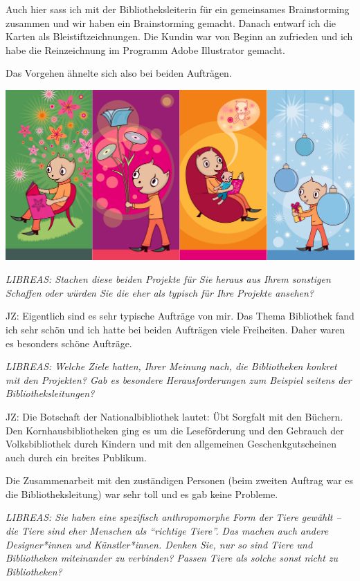 \documentclass[a4paper,
fontsize=11pt,
oneside,
numbers=noperiodatend,
parskip=half-,
bibliography=totoc,
final
]{scrartcl}
\begin{document}
Auch hier sass ich mit der Bibliotheksleiterin für ein gemeinsames
Brainstorming zusammen und wir haben ein Brainstorming gemacht. Danach
entwarf ich die Karten als Bleistiftzeichnungen. Die Kundin war von
Beginn an zufrieden und ich habe die Reinzeichnung im Programm Adobe
Illustrator gemacht.

Das Vorgehen ähnelte sich also bei beiden Aufträgen.

\begin{center}
\includegraphics{img/image2.png}
\end{center}

\emph{LIBREAS: Stachen diese beiden Projekte für Sie heraus aus Ihrem
sonstigen Schaffen oder würden Sie die eher als typisch für Ihre
Projekte ansehen?}

JZ: Eigentlich sind es sehr typische Aufträge von mir. Das Thema
Bibliothek fand ich sehr schön und ich hatte bei beiden Aufträgen viele
Freiheiten. Daher waren es besonders schöne Aufträge.

\emph{LIBREAS: Welche Ziele hatten, Ihrer Meinung nach, die Bibliotheken
konkret mit den Projekten? Gab es besondere Herausforderungen zum
Beispiel seitens der Bibliotheksleitungen?}

JZ: Die Botschaft der Nationalbibliothek lautet: Übt Sorgfalt mit den
Büchern. Den Kornhausbibliotheken ging es um die Leseförderung und den
Gebrauch der Volksbibliothek durch Kindern und mit den allgemeinen
Geschenkgutscheinen auch durch ein breites Publikum.

Die Zusammenarbeit mit den zuständigen Personen (beim zweiten Auftrag
war es die Bibliotheksleitung) war sehr toll und es gab keine Probleme.

\emph{LIBREAS: Sie haben eine spezifisch anthropomorphe Form der Tiere
gewählt -- die Tiere sind eher Menschen als \enquote{richtige Tiere}.
Das machen auch andere Designer*innen und Künstler*innen. Denken Sie,
nur so sind Tiere und Bibliotheken miteinander zu verbinden? Passen
Tiere als solche sonst nicht zu Bibliotheken?}
\end{document}
